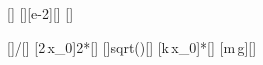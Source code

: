[\kg]
[\cm][e-2][\meter]
[\mpss]

[]{\mKX*\gX/\xoX}[\Npm]
[2\,x_0]{2*\xoX}[\meter]
[]{sqrt(\gX*\xoX)}[\mps]
[k\,x_0]{*\xoX}[\newton]
[m\,g]{\mKX*\gX}[\newton]
